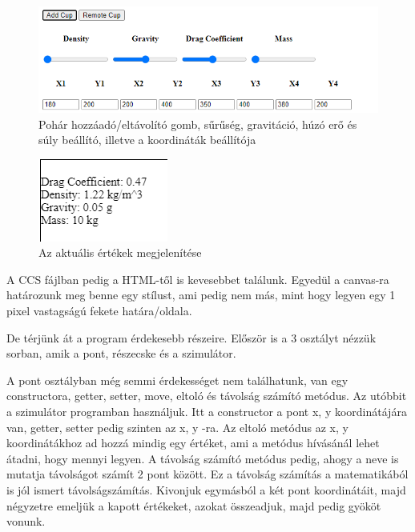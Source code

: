 \begin{figure}[h]
	\centering
	\includegraphics[scale=1]{images/html.png}
	\caption{Pohár hozzáadó/eltávolító gomb, sűrűség, gravitáció, húzó erő és súly beállító, illetve a koordináták beállítója}
	\label{fig:html}
\end{figure}

\begin{figure}[h]
	\centering
	\includegraphics[scale=1]{images/ertekek.png}
	\caption{Az aktuális értékek megjelenítése}
	\label{fig:ertekek}
\end{figure}


A CCS fájlban pedig a HTML-től is kevesebbet találunk. Egyedül a canvas-ra határozunk meg benne egy stílust, ami pedig nem más, mint hogy legyen egy 1 pixel vastagságú fekete határa/oldala.


De térjünk át a program érdekesebb részeire. Először is a 3 osztályt nézzük sorban, amik a pont, részecske és a szimulátor.


A pont osztályban még semmi érdekességet nem találhatunk, van egy constructora, getter, setter, move, eltoló és távolság számító metódus. Az utóbbit a szimulátor programban használjuk. Itt a constructor a pont x, y koordinátájára van, getter, setter pedig szinten az x, y -ra. Az eltoló metódus az x, y koordinátákhoz ad hozzá mindig egy értéket, ami a metódus hívásánál lehet átadni, hogy mennyi legyen. A távolság számító metódus pedig, ahogy a neve is mutatja távolságot számít 2 pont között. Ez a távolság számítás a matematikából is jól ismert távolságszámítás. Kivonjuk egymásból a két pont koordinátáit, majd négyzetre emeljük a kapott értékeket, azokat összeadjuk, majd pedig gyököt vonunk. 

